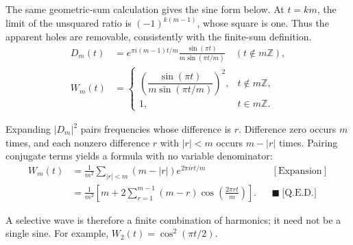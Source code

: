 The same geometric-sum calculation gives the sine form below. At $t=km$,
the limit of the unsquared ratio is $(-1)^{k(m-1)}$, whose square is one.
Thus the apparent holes are removable, consistently with the finite-sum definition.
\begin{equation*}
\begin{aligned}
D_m(t)&=e^{\pi i(m-1)t/m}\frac{\sin(\pi t)}{m\sin(\pi t/m)}
\quad(t\notin m\mathbb Z),\\
W_m(t)&=\begin{cases}
\left(\dfrac{\sin(\pi t)}{m\sin(\pi t/m)}\right)^2,&t\notin m\mathbb Z,\\
1,&t\in m\mathbb Z.
\end{cases}
\end{aligned}
\end{equation*}

Expanding $|D_m|^2$ pairs frequencies whose difference is $r$. Difference zero
occurs $m$ times, and each nonzero difference $r$ with $|r| < m$ occurs $m-|r|$
times. Pairing conjugate terms yields a formula with no variable denominator:
\begin{equation*}
\begin{aligned}
W_m(t)&=\frac1{m^2}\sum_{|r| < m}(m-|r|)e^{2\pi i r t/m}
&&[\text{Expansion}]\\
&=\frac1{m^2}\left[m+2\sum_{r=1}^{m-1}(m-r)
\cos\left(\frac{2\pi r t}{m}\right)\right].
&&\blacksquare\ \text{[Q.E.D.]}
\end{aligned}
\end{equation*}

A selective wave is therefore a finite combination of harmonics; it need
not be a single sine. For example, $W_2(t)=\cos^2(\pi t/2)$.
